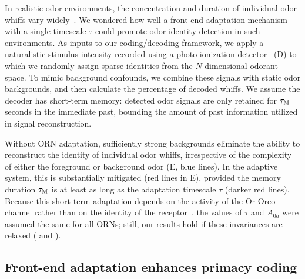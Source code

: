 \documentclass[9pt,lineno]{elife}
\begin{document}
In realistic odor environments, the concentration and duration of individual odor whiffs vary widely~\citep{celani}. We wondered how well a front-end adaptation mechanism with a single timescale $\tau$ could promote odor identity detection in such environments. As inputs to our coding/decoding framework, we apply a naturalistic stimulus intensity recorded using a photo-ionization detector~\citep{srinivas_elife} (D) to which we randomly assign sparse identities from the $N$-dimensional odorant space. To mimic background confounds, we combine these signals with static odor backgrounds, and then calculate the percentage of decoded whiffs. We assume the decoder has short-term memory: detected odor signals are only retained for $\tau_{\textup {M}}$ seconds in the immediate past, {\color{blue} bounding the amount of past information utilized in signal reconstruction. }

Without ORN adaptation, sufficiently strong backgrounds eliminate the ability to reconstruct the identity of individual odor whiffs, irrespective of the complexity of either the foreground or background odor (E, blue lines). In the adaptive system, this is substantially mitigated (red lines in E), provided the memory duration $\tau_{\textup {M}}$ is at least as long as the adaptation timescale $\tau$ (darker red lines). Because this short-term adaptation depends on the activity of the Or-Orco channel rather than on the identity of the receptor~\citep{nagel_wilson_biophysical,martelli,srinivas_elife}, the values of $\tau$ and $A_{0a}$ were assumed the same for all ORNs; still, our results hold if these invariances are relaxed ( and ). 










\subsection{Front-end adaptation enhances primacy coding}
\end{document}
